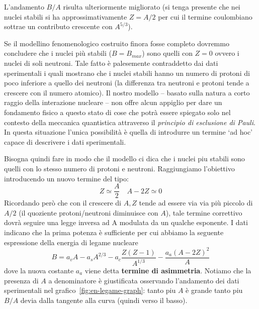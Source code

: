 L'andamento $B / A$ risulta ulteriormente migliorato (si tenga presente
che nei nuclei stabili si ha approssimativamente \(Z=A/2\) per cui il
termine coulombiano sottrae un contributo crescente con \(A^{5/3}\)).

Se il modellino fenomenologico costruito finora fosse completo dovremmo
concludere che i nuclei più stabili (\(B= B_{max}\)) sono quelli con
\(Z=0\) ovvero i nuclei di soli neutroni.
Tale fatto è palesemente
contraddetto dai dati sperimentali i quali mostrano che i nuclei stabili
hanno un numero di protoni di poco inferiore a quello dei neutroni (la
differenza tra neutroni e protoni tende a crescere con il numero
atomico).
Il nostro modello -- basato sulla natura a corto raggio della
interazione nucleare -- non offre alcun appiglio per dare un fondamento
fisico a questo stato di cose che potrà essere spiegato solo nel
contesto della meccanica quantistica attraverso il \emph{principio di
	esclusione di Pauli}.
In questa situazione l'unica possibilità è quella
di introdurre un termine `ad hoc' capace di descrivere i dati
sperimentali.

Bisogna quindi fare in modo che il modello ci dica che i nuclei piu
stabili sono quelli con lo stesso numero di protoni e neutroni.
Raggiungiamo l'obiettivo introducendo un nuovo termine del tipo:
\[
	Z \simeq \frac{A}{2} \quad A - 2Z \simeq 0
\]
Ricordando però che con il crescere di \(A, Z\) tende ad essere via
via più piccolo di \(A/2\) (il quoziente protoni/neutroni diminuisce con
\(A\)), tale termine correttivo dovrà seguire una legge inversa ad A
modulata da un qualche esponente.
I dati indicano che la prima potenza è
sufficiente per cui abbiamo la seguente espressione della energia di
legame nucleare
\[
	B = a_{v}A - a_{s}A^{2/3} - a_{c} \frac{Z(Z-1)}{A^{1/3}} - \frac{a_{a}(A-2Z)^{2}}{A}
\]
dove la nuova costante \(a_{a}\) viene detta \textbf{termine di asimmetria}.
Notiamo che la presenza di \(A\) a denominatore è
giustificata osservando l'andamento dei dati sperimentali nel grafico~\ref{fig:en-legame-graph}: tanto piu \(A\) è grande tanto piu \(B / A\) devia
dalla tangente alla curva (quindi verso il basso).
\bigskip

